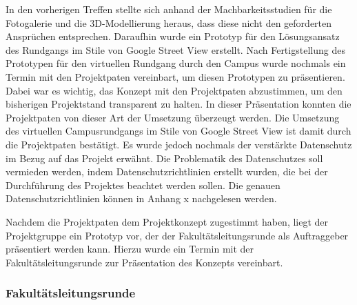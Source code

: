 In den vorherigen Treffen stellte sich anhand der Machbarkeitsstudien für die
Fotogalerie und die 3D-Modellierung heraus, dass diese nicht den geforderten
Ansprüchen entsprechen. Daraufhin wurde ein Prototyp für den Lösungsansatz des
Rundgangs im Stile von Google Street View erstellt. Nach Fertigstellung des
Prototypen für den virtuellen Rundgang durch den Campus wurde nochmals ein
Termin mit den Projektpaten vereinbart, um diesen Prototypen zu präsentieren.
Dabei war es wichtig, das Konzept mit den Projektpaten abzustimmen, um den bisherigen Projektstand transparent zu halten. In dieser Präsentation konnten die Projektpaten von dieser Art der Umsetzung überzeugt werden. Die Umsetzung des
virtuellen Campusrundgangs im Stile von Google Street View ist damit durch die Projektpaten bestätigt. Es wurde jedoch nochmals der verstärkte Datenschutz im Bezug auf das Projekt 
erwähnt. Die Problematik des Datenschutzes soll vermieden werden, indem Datenschutzrichtlinien erstellt wurden, die bei 
der Durchführung des Projektes beachtet werden sollen. Die genauen
Datenschutzrichtlinien können in Anhang x nachgelesen werden.

Nachdem die Projektpaten dem Projektkonzept zugestimmt haben, liegt der Projektgruppe ein Prototyp vor, der der 
Fakultätsleitungsrunde als Auftraggeber präsentiert werden kann.
Hierzu wurde ein Termin mit der Fakultätsleitungsrunde zur Präsentation des Konzepts vereinbart.




\subsubsection*{Fakultätsleitungsrunde}
\label{sec:Treffen4}

